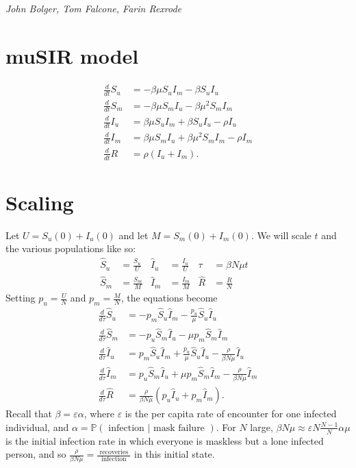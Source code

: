 \documentclass[11pt]{article}
\begin{document}
\noindent\textit{John Bolger, Tom Falcone, Farin Rexrode}
\section*{muSIR model}

\begin{align*}
  \frac{d}{dt}S_{u} &= -\beta \mu S_{u} I_{m} - \beta S_{u} I_{u} \\
  \frac{d}{dt}S_{m} &= -\beta \mu S_{m} I_{u} - \beta \mu^2 S_{m} I_{m} \\
  \frac{d}{dt}I_{u} &= \beta \mu S_{u} I_{m} + \beta S_{u} I_{u}-\rho I_{u} \\
  \frac{d}{dt}I_{m} &= \beta \mu S_{m} I_{u} + \beta \mu^2 S_{m} I_{m}-\rho I_{m} \\
  \frac{d}{dt}R &= \rho (I_{u}+I_{m}).
\end{align*}

\section*{Scaling}
Let $U = S_{u}(0) + I_{u}(0)$ and let $M = S_{m}(0) + I_{m}(0)$. We will scale $t$ and the various populations like so:
\begin{align*}
  \hat{S}_{u} &= \frac{S_{u}}{U} & \hat{I}_{u} &= \frac{I_{u}}{U} & \tau &= \beta N \mu t&\\
  \hat{S}_{m} &= \frac{S_{m}}{M} & \hat{I}_{m} &= \frac{I_{m}}{M} & \hat{R} &= \frac{R}{N}
\end{align*}
Setting $p_{u} = \frac{U}{N}$ and $p_{m} = \frac{M}{N}$, the equations become
\begin{align*}
  \frac{d}{d\tau}\hat{S}_{u} &= - p_{m}\hat{S}_{u} \hat{I}_{m} -  \frac{p_{u}}{\mu}\hat{S}_{u} \hat{I}_{u} \\
  \frac{d}{d\tau}\hat{S}_{m} &= - p_{u}\hat{S}_{m} \hat{I}_{u} -  \mu p_{m}\hat{S}_{m} \hat{I}_{m} \\
  \frac{d}{d\tau}\hat{I}_{u} &=  p_{m} \hat{S}_{u} \hat{I}_{m} + \frac{p_{u}}{\mu} \hat{S}_{u} \hat{I}_{u}-\frac{\rho}{\beta N\mu} \hat{I}_{u} \\
  \frac{d}{d\tau}\hat{I}_{m} &=  p_{u} \hat{S}_{m} \hat{I}_{u} +  \mu p_{m}\hat{S}_{m} \hat{I}_{m}-\frac{\rho}{\beta N\mu} \hat{I}_{m} \\
  \frac{d}{d\tau}\hat{R} &= \frac{\rho}{\beta N\mu} (p_{u}\hat{I}_{u}+ p_{m}\hat{I}_{m}).
\end{align*}
Recall that $\beta = \varepsilon \alpha$, where $\varepsilon$ is the per capita rate of encounter for one infected individual, and $\alpha = \mathbb P(\text{ infection | mask failure })$. For $N$ large, $\beta N \mu \approx \varepsilon N \frac{N-1}{N}\alpha \mu$ is the initial infection rate in which everyone is maskless but a lone infected person, and so $\frac{\rho}{\beta N \mu} = \frac{\text{ recoveries }}{\text{ infection }}$ in this initial state.
\end{document}
